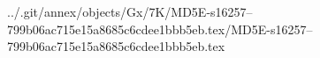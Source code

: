 ../.git/annex/objects/Gx/7K/MD5E-s16257--799b06ac715e15a8685c6cdee1bbb5eb.tex/MD5E-s16257--799b06ac715e15a8685c6cdee1bbb5eb.tex